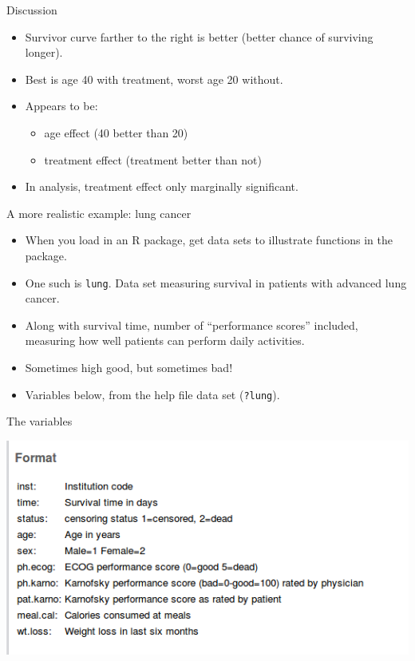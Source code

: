\documentclass[unknownkeysallowed]{beamer}\usepackage[]{graphicx}\usepackage[]{color}
\begin{document}
\begin{frame}[fragile]{Discussion}

  
  \begin{itemize}
  \item Survivor curve farther to the right is better (better chance
    of surviving longer).
  \item Best is age 40 with treatment, worst age 20 without.
  \item Appears to be:
    \begin{itemize}
    \item age effect (40 better than 20)
    \item treatment effect (treatment better than not)
    \end{itemize}
  \item In analysis, treatment effect only marginally significant.
  \end{itemize}

\end{frame}



\begin{frame}[fragile]{A more realistic example: lung cancer}


\begin{itemize}
\item When you
load in an R package, get data sets to illustrate 
functions in the package. 
\item One such is \texttt{lung}. Data
set measuring survival in patients with advanced lung cancer. 
\item Along with survival time, number of ``performance scores''
  included, measuring how well patients can perform daily
  activities.
\item Sometimes high good, but sometimes bad!
\item Variables below,
  from the help file data set (\texttt{?lung}).
\end{itemize}
\end{frame}

\begin{frame}[fragile]{The variables}

\includegraphics[width=\textwidth]{lung-cancer-data}  

  
\end{frame}
\end{document}
